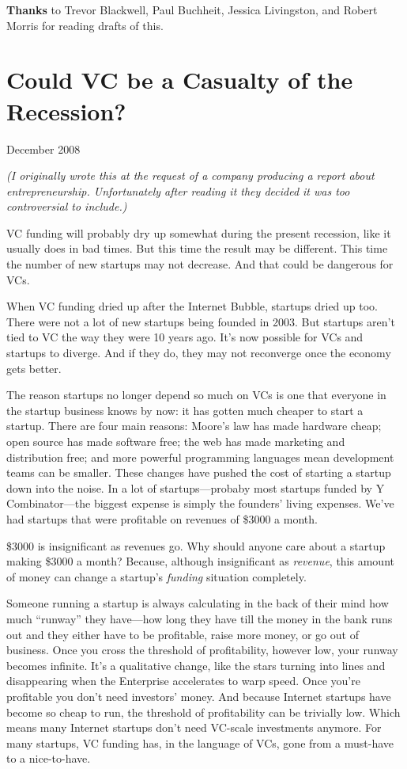 \documentclass[12pt]{book}
\begin{document}
\textbf{Thanks} to Trevor Blackwell, Paul Buchheit, Jessica Livingston,
and Robert Morris for reading drafts of this.
\chapter{Could VC be a Casualty of the Recession?}

December 2008

\emph{(I originally wrote this at the request of a company producing a
report about entrepreneurship. Unfortunately after reading it they
decided it was too controversial to include.)}

VC funding will probably dry up somewhat during the present recession,
like it usually does in bad times. But this time the result may be
different. This time the number of new startups may not decrease. And
that could be dangerous for VCs.

When VC funding dried up after the Internet Bubble, startups dried up
too. There were not a lot of new startups being founded in 2003. But
startups aren't tied to VC the way they were 10 years ago. It's now
possible for VCs and startups to diverge. And if they do, they may not
reconverge once the economy gets better.

The reason startups no longer depend so much on VCs is one that everyone
in the startup business knows by now: it has gotten much cheaper to
start a startup. There are four main reasons: Moore's law has made
hardware cheap; open source has made software free; the web has made
marketing and distribution free; and more powerful programming languages
mean development teams can be smaller. These changes have pushed the
cost of starting a startup down into the noise. In a lot of
startups---probaby most startups funded by Y Combinator---the biggest
expense is simply the founders' living expenses. We've had startups that
were profitable on revenues of \$3000 a month.

\$3000 is insignificant as revenues go. Why should anyone care about a
startup making \$3000 a month? Because, although insignificant as
\emph{revenue}, this amount of money can change a startup's
\emph{funding} situation completely.

Someone running a startup is always calculating in the back of their
mind how much ``runway'' they have---how long they have till the money
in the bank runs out and they either have to be profitable, raise more
money, or go out of business. Once you cross the threshold of
profitability, however low, your runway becomes infinite. It's a
qualitative change, like the stars turning into lines and disappearing
when the Enterprise accelerates to warp speed. Once you're profitable
you don't need investors' money. And because Internet startups have
become so cheap to run, the threshold of profitability can be trivially
low. Which means many Internet startups don't need VC-scale investments
anymore. For many startups, VC funding has, in the language of VCs, gone
from a must-have to a nice-to-have.
\end{document}

